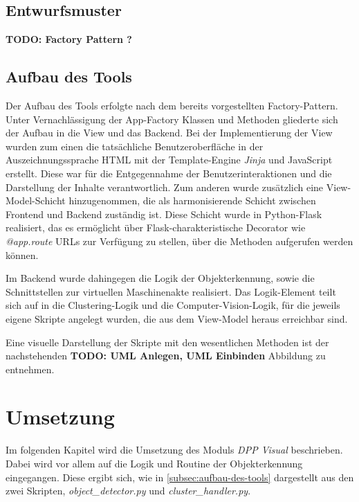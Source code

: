 \documentclass[
    type=Projektarbeit,
    status=draft, %
    language=german, %
    bibengine=bibtex,
]{unibwm-inf-thesis}
\newcommand{\todo}[1]{\textbf{TODO: #1}}
\begin{document}
    \subsection{Entwurfsmuster}\label{subsec:entwurfsmuster}
    \todo{Factory Pattern ?}

    \subsection{Aufbau des Tools} \label{subsec:aufbau-des-tools}
    Der Aufbau des Tools erfolgte nach dem bereits vorgestellten Factory-Pattern. 
    Unter Vernachlässigung der App-Factory Klassen und Methoden gliederte sich der Aufbau in die View und das Backend.
    Bei der Implementierung der View wurden zum einen die tatsächliche Benutzeroberfläche in der Auszeichnungssprache
    HTML mit der Template-Engine \textit{Jinja} und JavaScript erstellt.
    Diese war für die Entgegennahme der Benutzerinteraktionen und die Darstellung der Inhalte verantwortlich.
    Zum anderen wurde zusätzlich eine View-Model-Schicht hinzugenommen, die als harmonisierende Schicht zwischen
    Frontend und Backend zuständig ist.
    Diese Schicht wurde in Python-Flask realisiert, das es ermöglicht über Flask-charakteristische Decorator wie
    \textit{@app.route} URLs zur Verfügung zu stellen, über die Methoden aufgerufen werden können.

    Im Backend wurde dahingegen die Logik der Objekterkennung, sowie die Schnittstellen zur virtuellen Maschinenakte realisiert.
    Das Logik-Element teilt sich auf in die Clustering-Logik und die Computer-Vision-Logik, für die jeweils eigene
    Skripte angelegt wurden, die aus dem View-Model heraus erreichbar sind.

    Eine visuelle Darstellung der Skripte mit den wesentlichen Methoden ist der nachstehenden
    \todo{UML Anlegen, UML Einbinden} Abbildung zu entnehmen.
    
    \section{Umsetzung}
    Im folgenden Kapitel wird die Umsetzung des Moduls \textit{DPP Visual} beschrieben.
    Dabei wird vor allem auf die Logik und Routine der Objekterkennung eingegangen.
    Diese ergibt sich, wie in \autoref{subsec:aufbau-des-tools} dargestellt aus den zwei Skripten, \textit{object\_detector.py} und \textit{cluster\_handler.py}.
\end{document}
